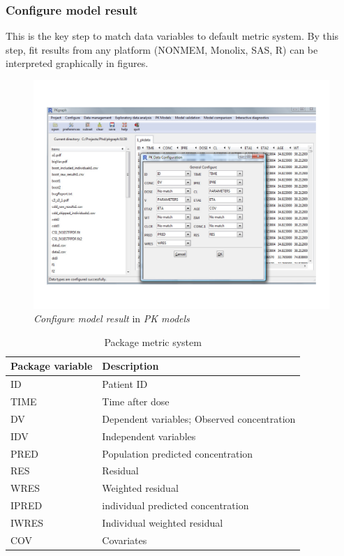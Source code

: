 \documentclass[a4paper]{article}
\begin{document}
\subsubsection{Configure model result}
This is the key step to match data variables to default metric system. By this step, fit results from any platform (NONMEM, Monolix, SAS, R) can be interpreted graphically in figures.
\begin{figure}[h!tb] \centering
\includegraphics[scale=0.6]{pkmodel_config.pdf}
\caption{\textit{Configure model result} in \textit{PK models}}
\label{pkmodel_config}
\end{figure}
\begin{table}[h!tb] \centering
\begin{tabular}{ll} \hline
\textbf{Package variable} & \textbf{Description}  \\ \hline
ID & Patient ID \\
TIME & Time after dose \\
DV & Dependent variables; Observed concentration \\
IDV & Independent variables \\
PRED & Population predicted concentration \\
RES & Residual \\
WRES & Weighted residual \\
IPRED & individual predicted concentration \\
IWRES & Individual weighted residual \\
COV & Covariates \\ 
\hline
\end{tabular}
\caption{Package metric system}
\label{c2_s3_t1}
\end{table}
\end{document}
